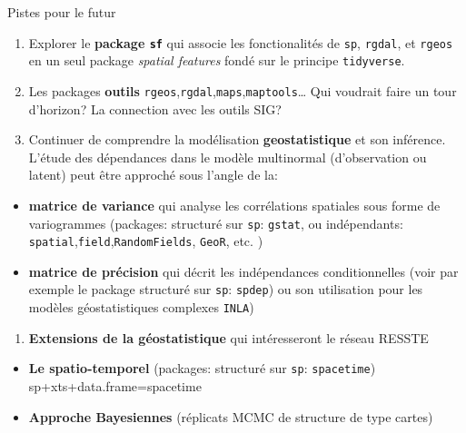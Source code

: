 \documentclass[8pt,ignorenonframetext,]{beamer}
\providecommand{\tightlist}{%
\setlength{\itemsep}{0pt}\setlength{\parskip}{0pt}}
\begin{document}
\begin{frame}[fragile]{Pistes pour le futur}

\begin{enumerate}
\def\labelenumi{\arabic{enumi}.}
\item
  Explorer le \textbf{package \texttt{sf} } qui associe les
  fonctionalités de \texttt{sp}, \texttt{rgdal}, et \texttt{rgeos} en un
  seul package \emph{spatial features} fondé sur le principe
  \texttt{tidyverse}.
\item
  Les packages \textbf{outils}
  \texttt{rgeos},\texttt{rgdal},\texttt{maps},\texttt{maptools}\ldots{}
  Qui voudrait faire un tour d'horizon? La connection avec les outils
  SIG?
\item
  Continuer de comprendre la modélisation \textbf{geostatistique} et son
  inférence. L'étude des dépendances dans le modèle multinormal
  (d'observation ou latent) peut être approché sous l'angle de la:
\end{enumerate}

\begin{itemize}
\tightlist
\item
  \textbf{matrice de variance} qui analyse les corrélations spatiales
  sous forme de variogrammes (packages: structuré sur \texttt{sp}:
  \texttt{gstat}, ou indépendants:
  \texttt{spatial},\texttt{field},\texttt{RandomFields}, \texttt{GeoR},
  etc. )
\item
  \textbf{matrice de précision} qui décrit les indépendances
  conditionnelles (voir par exemple le package structuré sur
  \texttt{sp}: \texttt{spdep}) ou son utilisation pour les modèles
  géostatistiques complexes \texttt{INLA})
\end{itemize}

\begin{enumerate}
\def\labelenumi{\arabic{enumi}.}
\setcounter{enumi}{3}
\tightlist
\item
  \textbf{Extensions de la géostatistique } qui intéresseront le réseau
  RESSTE
\end{enumerate}

\begin{itemize}
\tightlist
\item
  \textbf{Le spatio-temporel} (packages: structuré sur \texttt{sp}:
  \texttt{spacetime}) sp+xts+data.frame=spacetime
\item
  \textbf{Approche Bayesiennes} (réplicats MCMC de structure de type
  cartes)
\end{itemize}

\end{frame}
\end{document}
